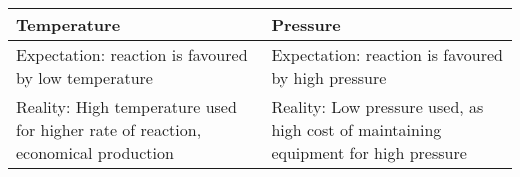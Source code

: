 \begin{table}[H]
\centering
\begin{tabular}{p{7.5cm}p{7.5cm}}
\hline\hline
\textbf{Temperature} & \textbf{Pressure} \\
\hline
Expectation: reaction is favoured by low temperature & Expectation: reaction is favoured by high pressure \\
\hline
Reality: High temperature used for higher rate of reaction, economical production & Reality: Low pressure used, as high cost of maintaining equipment for high pressure \\
\hline\hline
\end{tabular}
\end{table}
\pagebreak

